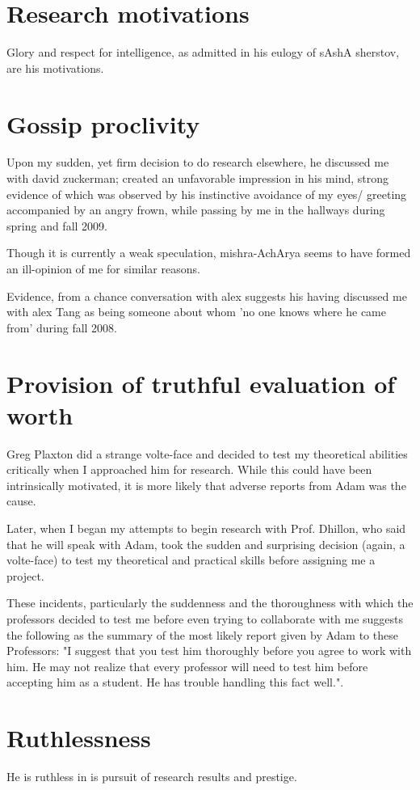 \documentclass[oneside, article]{memoir}
\begin{document}
\section{Research motivations}
Glory and respect for intelligence, as admitted in his eulogy of sAshA sherstov, are his motivations.

\section{Gossip proclivity}
Upon my sudden, yet firm decision to do research elsewhere, he discussed me with david zuckerman; created an unfavorable impression in his mind, strong evidence of which was observed by his instinctive avoidance of my eyes/ greeting accompanied by an angry frown, while passing by me in the hallways during spring and fall 2009.

\subitem Though it is currently a weak speculation, mishra-AchArya seems to have formed an ill-opinion of me for similar reasons.

Evidence, from a chance conversation with alex suggests his having discussed me with alex Tang as being someone about whom 'no one knows where he came from' during fall 2008.

\section{Provision of truthful evaluation of worth}
Greg Plaxton did a strange volte-face and decided to test my theoretical abilities critically when I approached him for research. While this could have been intrinsically motivated, it is more likely that adverse reports from Adam was the cause.

Later, when I began my attempts to begin research with Prof. Dhillon, who said that he will speak with Adam, took the sudden and surprising decision (again, a volte-face) to test my theoretical and practical skills before assigning me a project.

These incidents, particularly the suddenness and the thoroughness with which the professors decided to test me before even trying to collaborate with me suggests the following as the summary of the most likely report given by Adam to these Professors: "I suggest that you test him thoroughly before you agree to work with him. He may not realize that every professor will need to test him before accepting him as a student. He has trouble handling this fact well.".

\section{Ruthlessness}
He is ruthless in is pursuit of research results and prestige.
\end{document}
